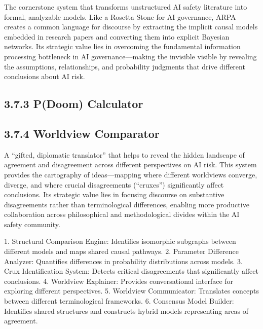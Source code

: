 \documentclass[
  11pt,
  letterpaper,
]{book}
\begin{document}
The cornerstone system that transforms unstructured AI safety literature
into formal, analyzable models. Like a Rosetta Stone for AI governance,
ARPA creates a common language for discourse by extracting the implicit
causal models embedded in research papers and converting them into
explicit Bayesian networks. Its strategic value lies in overcoming the
fundamental information processing bottleneck in AI governance---making
the invisible visible by revealing the assumptions, relationships, and
probability judgments that drive different conclusions about AI risk.

\subsubsection*{}\label{section}

\subsection*{3.7.3 P(Doom) Calculator}\label{pdoom-calculator}

\subsection*{\texorpdfstring{3.7.4 \textbf{Worldview
Comparator}}{3.7.4 Worldview Comparator}}\label{worldview-comparator}

A ``gifted, diplomatic translator'' that helps to reveal the hidden
landscape of agreement and disagreement across different perspectives on
AI risk. This system provides the cartography of ideas---mapping where
different worldviews converge, diverge, and where crucial disagreements
(``cruxes'') significantly affect conclusions. Its strategic value lies
in focusing discourse on substantive disagreements rather than
terminological differences, enabling more productive collaboration
across philosophical and methodological divides within the AI safety
community.

1. Structural Comparison Engine: Identifies isomorphic subgraphs between
different models and maps shared causal pathways. 2. Parameter
Difference Analyzer: Quantifies differences in probability distributions
across models. 3. Crux Identification System: Detects critical
disagreements that significantly affect conclusions. 4. Worldview
Explainer: Provides conversational interface for exploring different
perspectives. 5. Worldview Communicator: Translates concepts between
different terminological frameworks. 6. Consensus Model Builder:
Identifies shared structures and constructs hybrid models representing
areas of agreement.
\end{document}

